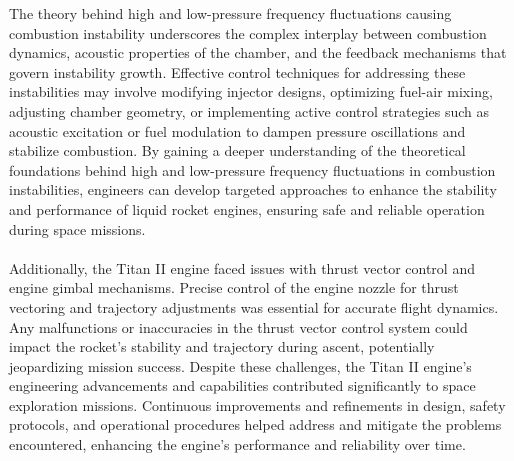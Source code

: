 \documentclass[8pt]{article} %
\begin{document}
The theory behind high and low-pressure frequency fluctuations causing combustion instability underscores the complex interplay between combustion dynamics, acoustic properties of the chamber, and the feedback mechanisms that govern instability growth. Effective control techniques for addressing these instabilities may involve modifying injector designs, optimizing fuel-air mixing, adjusting chamber geometry, or implementing active control strategies such as acoustic excitation or fuel modulation to dampen pressure oscillations and stabilize combustion.
By gaining a deeper understanding of the theoretical foundations behind high and low-pressure frequency fluctuations in combustion instabilities, engineers can develop targeted approaches to enhance the stability and performance of liquid rocket engines, ensuring safe and reliable operation during space missions.\\\\
Additionally, the Titan II engine faced issues with thrust vector control and engine gimbal mechanisms. Precise control of the engine nozzle for thrust vectoring and trajectory adjustments was essential for accurate flight dynamics. Any malfunctions or inaccuracies in the thrust vector control system could impact the rocket's stability and trajectory during ascent, potentially jeopardizing mission success.
Despite these challenges, the Titan II engine's engineering advancements and capabilities contributed significantly to space exploration missions. Continuous improvements and refinements in design, safety protocols, and operational procedures helped address and mitigate the problems encountered, enhancing the engine's performance and reliability over time.
\end{document}
